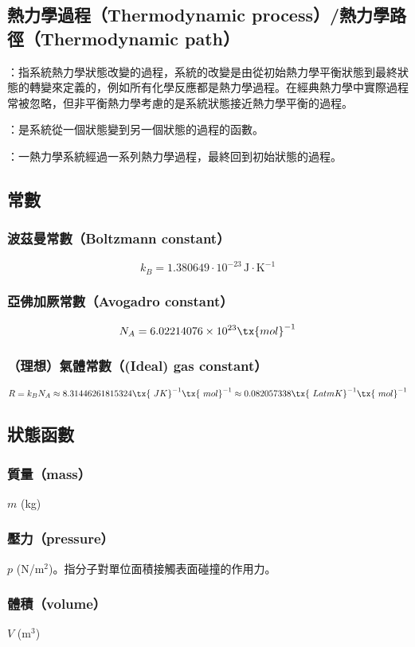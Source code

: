 \documentclass[a4paper,12pt]{report}
\begin{document}
\subsection{熱力學過程（Thermodynamic process）/熱力學路徑（Thermodynamic path）}
\bit
\item {}：指系統熱力學狀態改變的過程，系統的改變是由從初始熱力學平衡狀態到最終狀態的轉變來定義的，例如所有化學反應都是熱力學過程。在經典熱力學中實際過程常被忽略，但非平衡熱力學考慮的是系統狀態接近熱力學平衡的過程。
\item {}：是系統從一個狀態變到另一個狀態的過程的函數。
\item {}：一熱力學系統經過一系列熱力學過程，最終回到初始狀態的過程。
\eit
\subsection{常數}
\subsubsection{波茲曼常數（Boltzmann constant）}
\[k_B=1.380649\cdot 10^{-23}\,\text{J}\cdot\text{K}^{-1}\]
\subsubsection{亞佛加厥常數（Avogadro constant）}
\[N_A=6.02214076\times 10^{23} \tx{ mol}^{-1}\]
\subsubsection{（理想）氣體常數（(Ideal) gas constant）}
\[R=k_BN_A \approx 8.31446261815324 \tx{\ J K}^{-1}\tx{\ mol}^{-1}\approx 0.082057338 \tx{\ L atm K}^{-1}\tx{\ mol}^{-1}\]
\subsection{狀態函數}
\subsubsection{質量（mass）}
$m$ (kg)
\subsubsection{壓力（pressure）}
$p$ (N/m$^2$)。指分子對單位面積接觸表面碰撞的作用力。
\subsubsection{體積（volume）}
$V$ (m$^3$)
\end{document}
